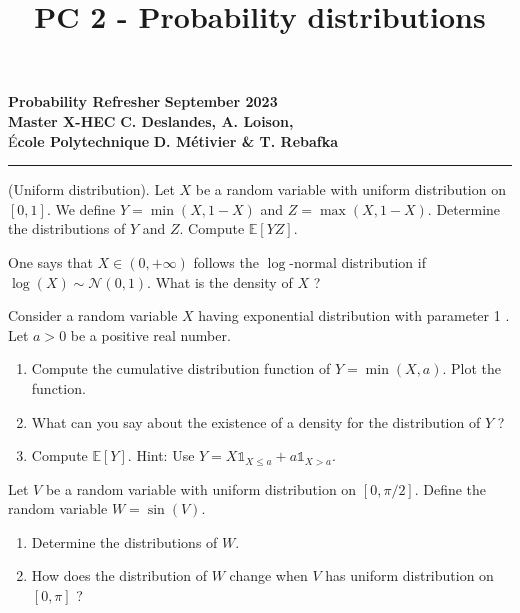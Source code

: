 \documentclass{article}
\title{PC 2 - Probability distributions}
\author{}
\date{}
\begin{document}
\begin{flushleft}
  \textbf{Probability Refresher} \hfill \textbf{September 2023} \\
  \textbf{Master X-HEC} \hfill \textbf{C. Deslandes, A. Loison,} \\
  É\textbf{cole Polytechnique} \hfill \textbf{D. Métivier \& T. Rebafka}
\end{flushleft}

{\let\newpage\relax\maketitle}
\vspace{-1.3cm}
\hrule

\vspace{0.5cm}



\begin{Exercise} (Uniform distribution). Let $X$ be a random variable with uniform distribution on $[0,1]$. We define $Y=\min (X, 1-X)$ and $Z=\max (X, 1-X)$. Determine the distributions of $Y$ and $Z$. Compute $\mathbb{E}[Y Z]$.

\end{Exercise} \begin{Exercise} One says that $X \in(0,+\infty)$ follows the $\log$-normal distribution if $\log (X) \sim \mathcal{N}(0,1)$. What is the density of $X$ ?

\end{Exercise} \begin{Exercise} Consider a random variable $X$ having exponential distribution with parameter 1 . Let $a>0$ be a positive real number.

  \begin{enumerate}
    \item Compute the cumulative distribution function of $Y=\min (X, a)$. Plot the function.

    \item What can you say about the existence of a density for the distribution of $Y$ ?

    \item Compute $\mathbb{E}[Y]$. Hint: Use $Y=X \mathbb{1}_{X \leq a}+a \mathbb{1}_{X>a}$.

  \end{enumerate}

\end{Exercise}

\begin{Exercise} Let $V$ be a random variable with uniform distribution on $[0, \pi / 2]$. Define the random variable $W=\sin (V)$.

  \begin{enumerate}
    \item Determine the distributions of $W$.

    \item How does the distribution of $W$ change when $V$ has uniform distribution on $[0, \pi]$ ?

  \end{enumerate}

\end{Exercise}
\end{document}
